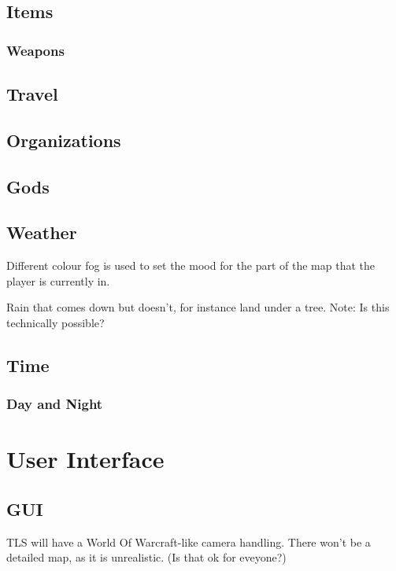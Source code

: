 \documentclass[a4paper]{report}
\begin{document}
	\chapter{Items}

		\section{Weapons}

	\chapter{Travel}

	\chapter{Organizations}

	\chapter{Gods}

	\chapter{Weather}

		Different colour fog is used to set the mood for the part of the map that the player is currently in.

		Rain that comes down but doesn't, for instance land under a tree.
		Note: Is this technically possible?

	\chapter{Time}

		\section{Day and Night}

\part{User Interface}

	\chapter{GUI}

		TLS will have a World Of Warcraft-like camera handling. There won't be a detailed map, as it is unrealistic. (Is that ok for eveyone?)
\end{document}
